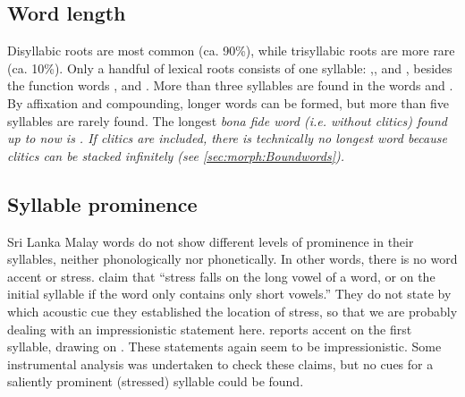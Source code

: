 \subsection{Word length}\label{sec:phon:Wordlength}
Disyllabic roots are most common (ca. 90\%), while trisyllabic roots are more rare (ca. 10\%). Only a handful of lexical roots consists of one syllable: ,,   and , besides the function words  ,  and . More than three syllables are found in the words   and . %
By affixation and compounding, longer words can be formed, but more than five syllables are rarely found. The longest \em bona fide \em word (i.e. without clitics) found up to now is . If clitics are included, there is technically no longest word because clitics can be stacked infinitely (see \ref{sec:morph:Boundwords}).



\subsection{Syllable prominence}\label{sec:phon:Syllableprominence}
Sri Lanka Malay words do not show different levels of prominence in their syllables, neither phonologically nor phonetically. In other words, there is no word accent or stress. \citet{SmithEtAl2004} claim that ``stress falls on the long vowel of a word, or on the initial syllable if the word only contains only short vowels.'' They do not state by which acoustic cue they established the location of stress, so that we are probably dealing with an impressionistic statement here. \citet{Bakker2006} reports accent on the first syllable, drawing on \citet{Robuchon2003}. These statements again seem to be impressionistic. Some instrumental analysis was undertaken to check these claims, but no cues for a saliently prominent (stressed) syllable
could be found.

